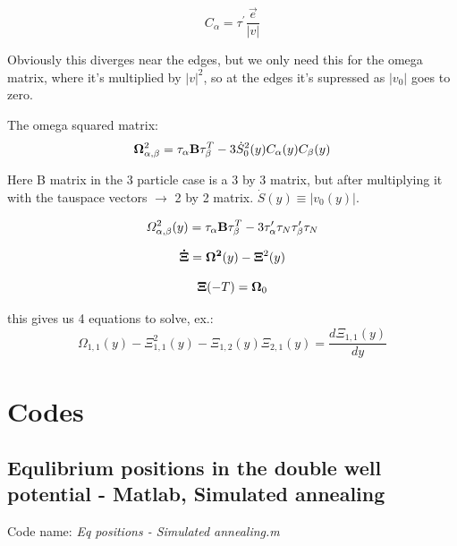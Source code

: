 \documentclass[12pt,a4paper]{article}
\numberwithin{equation}{section}
\begin{document}
\begin{equation}
C_\alpha = \tau^\prime \frac{\vec{e}}{|v|}
\end{equation}

Obviously this diverges near the edges, but we only need this for the omega matrix, where it's multiplied by $|v|^2$, so at the edges it's supressed as $|v_0|$ goes to zero.

The omega squared matrix:
\begin{equation}
{\bf{\Omega}}^2_{\alpha,\beta} = \tau_\alpha {\bf{B}} \tau_\beta^T - 3\dot{S}_0^2 (y) C_\alpha (y) C_\beta (y)
\end{equation}


Here B matrix in the 3 particle case is a 3 by 3 matrix, but after multiplying it with the tauspace vectors $\rightarrow$ 2 by 2 matrix. $\dot{S}(y) \equiv |v_0 (y)|$.


\begin{equation}
\Omega^2_{\alpha, \beta} (y) = \tau_\alpha {\bf{B}} \tau_\beta^T - 3 \tau^\prime_\alpha \tau_N \tau^\prime_\beta \tau_N
\end{equation}

\begin{equation}
{\bf{\dot{\Xi}}} = {\bf{\Omega}^2}(y) - {\bf{\Xi}}^2(y)
\end{equation}

\begin{equation}
{\bf{\Xi}}(-T) = {\bf{\Omega}}_0
\end{equation}

this gives us 4 equations to solve, ex.:
\begin{equation}
\Omega_{1,1}(y) - \Xi_{1,1}^2(y) - \Xi_{1,2}(y)\Xi_{2,1}(y) = \frac{d\Xi_{1,1}(y)}{dy}
\end{equation}














\newpage
\section{Codes}
\subsection{Equlibrium positions in the double well potential - Matlab, Simulated annealing}
Code name: \textit{Eq positions - Simulated annealing.m}\\
\end{document}
